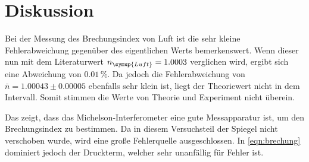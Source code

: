 \section{Diskussion}
\label{sec:Diskussion}



Bei der Messung des Brechungsindex  von Luft ist die sehr kleine Fehlerabweichung gegenüber des eigentlichen Werts bemerkenswert. Wenn dieser nun 
mit dem Literaturwert $n_{\symup{Luft}} = 1.0003$ \cite{brechung} verglichen wird, ergibt sich eine Abweichung von $0.01\,\%$. 
Da jedoch die Fehlerabweichung von $\bar{n} = 1.00043 \pm 0.00005$ ebenfalls sehr klein ist, liegt der Theoriewert nicht in dem Intervall. Somit stimmen die 
Werte von Theorie und Experiment nicht überein.

Das zeigt, dass das Michelson-Interferometer 
eine gute Messapparatur ist, um den Brechungsindex zu bestimmen. Da in diesem Versuchsteil der Spiegel nicht verschoben wurde, wird eine große Fehlerquelle 
ausgeschlossen. In \autoref{eqn:brechung} dominiert jedoch der Druckterm, welcher sehr unanfällig für Fehler ist.